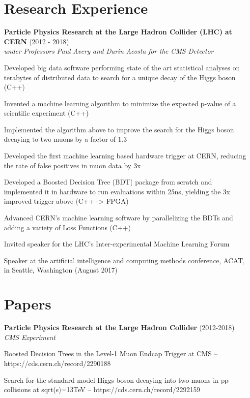 \begin{resume}
    \section{\mysidestyle Research Experience}
    {\bf Particle Physics Research at the Large Hadron Collider (LHC) at CERN} (2012 - 2018)\\\vspace{2mm}%
    \textit{under Professors Paul Avery and Darin Acosta for the CMS Detector}
    \begin{stuff}
        \vspace*{1mm}
                \item Developed big data software performing state of the art statistical analyses on terabytes of distributed data to search for a unique decay of the Higgs boson (C++)
                \item Invented a machine learning algorithm to minimize the expected p-value of a scientific experiment (C++)
                \vspace*{16mm} 
                \item Implemented the algorithm above to improve the search for the Higgs boson decaying to two muons by a factor of 1.3 
                \item Developed the first machine learning based hardware trigger at CERN, reducing the rate of false positives in muon data by 3x
                \item Developed a Boosted Decision Tree (BDT) package from scratch and implemented it in hardware to run evaluations within 25ns, yielding the 3x improved trigger above (C++ -> FPGA)
                \item Advanced CERN's machine learning software by parallelizing the BDTs and adding a variety of Loss Functions (C++)
                \item Invited speaker for the LHC's Inter-experimental Machine Learning Forum
                \item Speaker at the artificial intelligence and computing methods conference, ACAT, in Seattle, Washington (August 2017)
                                           
    \end{stuff}
    \section{\mysidestyle Papers}
    {\bf Particle Physics Research at the Large Hadron Collider} (2012-2018)\\\vspace{2mm}%
    \textit{CMS Experiment}
    \begin{stuff}
        \vspace*{1mm}
                \item Boosted Decision Trees in the Level-1 Muon Endcap Trigger at CMS -- \\\relax https://cds.cern.ch/record/2290188
                \item Search for the standard model Higgs boson decaying into two muons in pp collisions at sqrt(s)=13TeV -- https://cds.cern.ch/record/2292159
    \end{stuff}


\end{resume}
